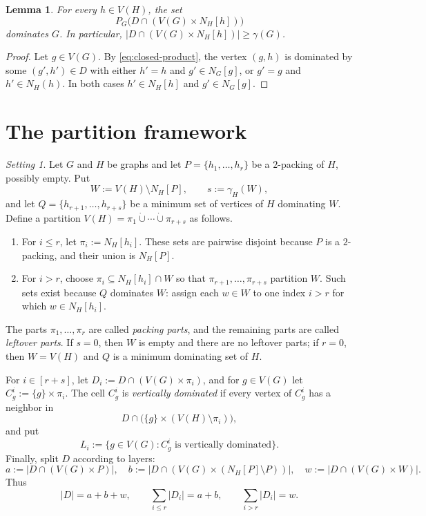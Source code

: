\documentclass[10pt]{amsart}
\newtheorem{lemma}[theorem]{Lemma}
\theoremstyle{remark}
\newtheorem{setting}[theorem]{Setting}
\newcommand{\N}{N}
\newcommand{\V}{V}
\newcommand{\PG}{P_G}
\begin{document}
\begin{lemma}\label{lem:layer-dominates}
For every $h\in\V(H)$, the set
\[
 \PG\bigl(D\cap(\V(G)\times\N_H[h])\bigr)
\]
dominates $G$. In particular,
$|D\cap(\V(G)\times\N_H[h])|\geq\gamma(G)$.
\end{lemma}

\begin{proof}
Let $g\in\V(G)$. By \eqref{eq:closed-product}, the vertex $(g,h)$ is
dominated by some $(g',h')\in D$ with either $h'=h$ and
$g'\in\N_G[g]$, or $g'=g$ and $h'\in\N_H(h)$. In both cases
$h'\in\N_H[h]$ and $g'\in\N_G[g]$.
\end{proof}

\section{The partition framework}\label{sec:partition}

\begin{setting}\label{setting:partition}
Let $G$ and $H$ be graphs and let
$P=\{h_1,\ldots,h_r\}$ be a $2$-packing of $H$, possibly empty. Put
\[
 W:=\V(H)\setminus\N_H[P],\qquad s:=\gamma_H(W),
\]
and let $Q=\{h_{r+1},\ldots,h_{r+s}\}$ be a minimum set of vertices of $H$
dominating $W$. Define a partition
$\V(H)=\pi_1\mathbin{\dot\cup}\cdots\mathbin{\dot\cup}\pi_{r+s}$ as follows.
\begin{enumerate}
\item For $i\leq r$, let $\pi_i:=\N_H[h_i]$. These sets are pairwise
disjoint because $P$ is a $2$-packing, and their union is $\N_H[P]$.
\item For $i>r$, choose $\pi_i\subseteq\N_H[h_i]\cap W$ so that
$\pi_{r+1},\ldots,\pi_{r+s}$ partition $W$. Such sets exist because $Q$
dominates $W$: assign each $w\in W$ to one index $i>r$ for which
$w\in\N_H[h_i]$.
\end{enumerate}
The parts $\pi_1,\ldots,\pi_r$ are called \emph{packing parts}, and the
remaining parts are called \emph{leftover parts}. If $s=0$, then $W$ is
empty and there are no leftover parts; if $r=0$, then $W=\V(H)$ and $Q$ is a
minimum dominating set of $H$.

For $i\in[r+s]$, let
$D_i:=D\cap(\V(G)\times\pi_i)$, and for $g\in\V(G)$ let
$C_g^i:=\{g\}\times\pi_i$. The cell $C_g^i$ is \emph{vertically dominated}
if every vertex of $C_g^i$ has a neighbor in
\[
 D\cap\bigl(\{g\}\times(\V(H)\setminus\pi_i)\bigr),
\]
and put
\[
 L_i:=\{g\in\V(G):C_g^i\text{ is vertically dominated}\}.
\]
Finally, split $D$ according to layers:
\[
 a:=|D\cap(\V(G)\times P)|,
\quad
 b:=|D\cap(\V(G)\times(\N_H[P]\setminus P))|,
\quad
 w:=|D\cap(\V(G)\times W)|.
\]
Thus
\[
 |D|=a+b+w,\qquad
 \sum_{i\leq r}|D_i|=a+b,\qquad
 \sum_{i>r}|D_i|=w.
\]
\end{setting}
\end{document}
